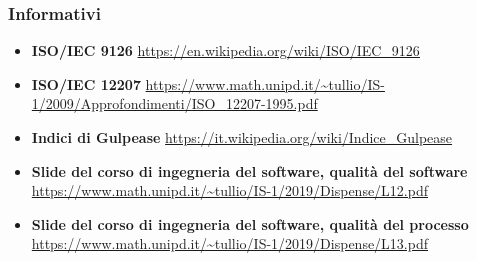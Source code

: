\subsubsection{Informativi}
\begin{itemize}
	\item \textbf {ISO/IEC 9126}
	\url {https://en.wikipedia.org/wiki/ISO/IEC_9126}
	\item \textbf{ISO/IEC 12207}
	\url{https://www.math.unipd.it/~tullio/IS-1/2009/Approfondimenti/ISO_12207-1995.pdf}
	\item \textbf {Indici di Gulpease}
	\url{https://it.wikipedia.org/wiki/Indice_Gulpease}
	\item \textbf {Slide del corso di ingegneria del software, qualità del software}
	\url{https://www.math.unipd.it/~tullio/IS-1/2019/Dispense/L12.pdf}
	\item \textbf {Slide del corso di ingegneria del software, qualità del processo}
	\url{https://www.math.unipd.it/~tullio/IS-1/2019/Dispense/L13.pdf}
\end{itemize}